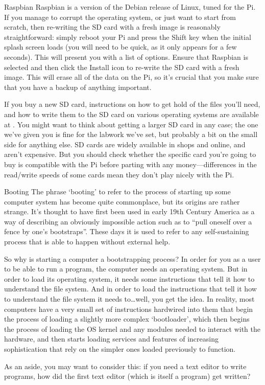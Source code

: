 \begin{rpi}{Raspbian}
  Raspbian is a version of the Debian release of Linux, tuned for the Pi. If you manage to corrupt the operating system, or just want to start from scratch, then re-writing the SD card with a fresh image is reasonably straightforward: simply reboot your Pi and press the Shift key when the initial splash screen loads (you will need to be quick, as it only appears for a few seconds). This will present you with a list of options. Ensure that Raspbian is selected and then click the Install icon to re-write the SD card with a fresh image. This will erase all of the data on the Pi, so it's crucial that you make sure that you have a backup of anything important.

  If you buy a new SD card, instructions on how to get hold of the files you'll need, and how to write them to the SD card on various operating systems are available at . You might want to think about getting a larger SD card in any case; the one we've given you is fine for the labwork we've set, but probably a bit on the small side for anything else. SD cards are widely available in shops and online, and aren't expensive. But you should check whether the specific card you're going to buy is compatible with the Pi before parting with any money---differences in the read/write speeds of some cards mean they don't play nicely with the Pi.
\end{rpi}


\begin{diversion}{Booting}
\label{bootbox}
The phrase `booting' to refer to the process of starting up some computer system has become quite commonplace, but its origins are rather strange. It's thought to have first been used in early 19th Century America as a way of describing an obviously impossible action such as to ``pull oneself over a fence by one's bootstraps''. These days it is used to refer to any self-sustaining process that is able to happen without external help.

So why is starting a computer a bootstrapping process? In order for you as a user to be able to run a program, the computer needs an operating system. But in order to load its operating system, it needs some instructions that tell it how to understand the file system. And in order to load the instructions that tell it how to understand the file system it needs to\ldots well, you get the idea. In reality, most computers have a very small set of instructions hardwired into them that begin the process of loading a  slightly more complex `bootloader', which then begins the process of loading the OS kernel and any modules needed to interact with the hardware, and then starts loading services and features of increasing sophistication that rely on the simpler ones loaded previously to function.

As an aside, you may want to consider this: if you need a text editor to write programs, how did the first text editor (which is itself a program) get written?
\end{diversion}

